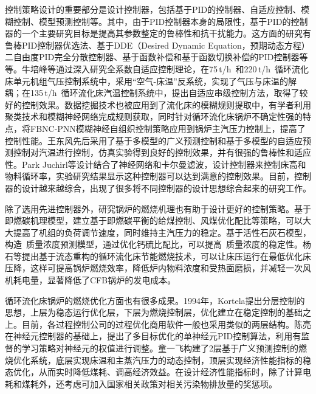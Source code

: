 控制策略设计的重要部分是设计控制器，包括基于PID的控制器、自适应控制、模糊控制、模型预测控制等。其中，由于PID控制器本身的局限性，基于PID的控制器的一个主要研究目标是提高其参数整定的鲁棒性和抗干扰能力。这方面的研究有鲁棒PID控制器优选法、基于DDE（Desired Dynamic Equation，预期动态方程）二自由度PID完全分散控制器、基于函数补偿和基于函数切换补偿的PID控制器等等\cite{徐峰2002鲁棒,郝玉春2012循环流化床燃烧系统的,郝玉春2013基于}。牛培峰等通过深入研究全系数自适应控制理论，在75$\,$\si[per-mode=symbol]{\tonne\per\hour}~和220$\,$\si[per-mode=symbol]{\tonne\per\hour}~循环流化床单元机组气压控制系统中，采用“空气-床温”反系统，实现了气压与床温的解耦；在135$\,$\si[per-mode=symbol]{\tonne\per\hour}~循环流化床汽温控制系统中，提出自适应串级控制方法，取得了较好的控制效果\cite{牛培峰2004大型国产循环流化床锅炉的汽温自适应串级控制系统,牛培峰2007循环流化床锅炉的汽压自适应控制系统}。数据挖掘技术也被应用到了流化床的模糊规则提取中，有学者利用聚类技术和模糊神经网络完成规则获取，同时针对循环流化床锅炉不确定性强的特点，将FBNC-PNN模糊神经自组织控制策略应用到锅炉主汽压力控制上，提高了控制性能\cite{王志强2003数据挖掘技术在循环流化床锅炉模糊控制系统中的应用}。王东风先后采用了基于多模型的广义预测控制和基于多模型的自适应预测控制对汽温进行控制，仿真实验得到良好的控制效果，并有很强的鲁棒性和适应性\cite{王东风2003循环流化床锅炉汽温系统的多模型自适应预测控制}。Park Juchirl等设计结合了神经网络和卡尔曼滤波，设计控制器来控制床高和物料循环率，实验研究结果显示这种控制器可以达到满意的控制效果\cite{Park2005The}。目前，控制器的设计越来越综合，出现了很多将不同控制器的设计思想综合起来的研究工作。

除了选用先进控制器外，研究锅炉的燃烧机理也有助于设计更好的控制策略。基于即燃碳机理模型，建立基于即燃碳平衡的给煤控制、风煤优化配比等策略，可以大大提高了机组的负荷调节速度，同时维持主汽压力的稳定。基于活性石灰石模型，构造~质量浓度预测模型，通过优化钙硫比配比，可以提高~质量浓度的稳定性\cite{高明明2014600MW}。杨石等提出基于流态重构的循环流化床节能燃烧技术，可以让床压运行在最低优化床压降，这样可提高锅炉燃烧效率，降低炉内物料浓度和受热面磨损，并减轻一次风机耗电量，显著降低了CFB锅炉的发电成本\cite{杨石2010基于流态重构的低能耗循环流化床锅炉技术}。

循环流化床锅炉的燃烧优化方面也有很多成果。1994年，Kortela提出分层控制的思想，上层为稳态运行优化层，下层为燃烧控制层\cite{kortela1994modelling}，优化建立在稳定控制的基础之上。目前，各过程控制公司的过程优化商用软件一般也采用类似的两层结构。陈亮在神经元控制器的基础上，提出了多目标优化的单神经元PID控制算法，利用有监督的学习策略对神经元的权值进行调整\cite{陈亮2005循环流化床锅炉建模及其智能控制系统的研究}。童一飞构建了2层基于广义预测控制的燃烧优化系统，底层实现床温和主蒸汽压力的动态控制，顶层实现经济性能指标的稳态优化，从而实时降低煤耗、调高经济效益\cite{童一飞2010基于广义预测控制的循环流化床锅炉燃烧过程多目标优化控制策略}。在设计经济性能指标时，除了计算电耗和煤耗外，还考虑可加入国家相关政策对相关污染物排放量的奖惩项\cite{谢磊2016循环流化床锅炉燃烧过程预测控制与经济性能优化}。


